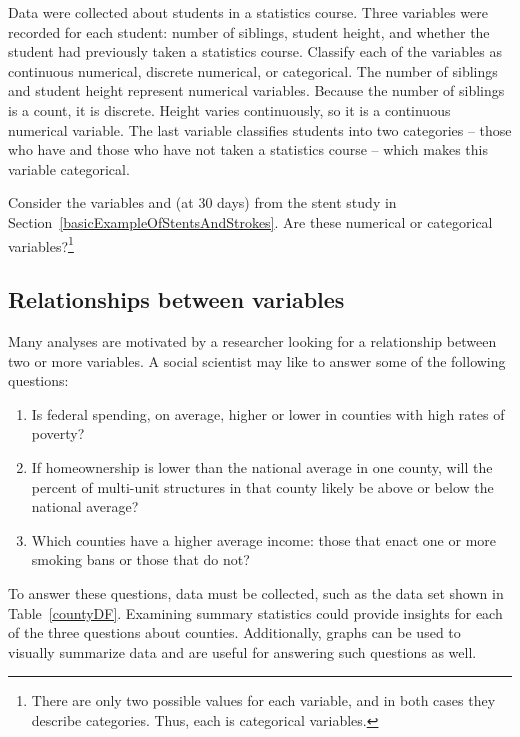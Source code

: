 \begin{example}{Data were collected about students in a statistics course. Three variables were recorded for each student: number of siblings, student height, and whether the student had previously taken a statistics course. Classify each of the variables as continuous numerical, discrete numerical, or categorical.}
The number of siblings and student height represent numerical variables. Because the number of siblings is a count, it is discrete. Height varies continuously, so it is a continuous numerical variable. The last variable classifies students into two categories -- those who have and those who have not taken a statistics course -- which makes this variable categorical.
\end{example}

\begin{exercise} 
Consider the variables  and  (at 30 days) from the stent study in Section~\ref{basicExampleOfStentsAndStrokes}. Are these numerical or categorical variables?\footnote{There are only two possible values for each variable, and in both cases they describe categories. Thus, each is categorical variables.}
\end{exercise}

\subsection{Relationships between variables}
\label{variableRelations}

Many analyses are motivated by a researcher looking for a relationship between two or more variables. A social scientist may like to answer some of the following questions:
\begin{enumerate}
\setlength{\itemsep}{0mm}
\item[(1)]\label{fedSpendingPovertyQuestion} Is federal spending, on average, higher or lower in counties with high rates of poverty?
\item[(2)]\label{ownershipMultiUnitQuestion} If homeownership is lower than the national average in one county, will the percent of multi-unit structures in that county likely be above or below the national average?
\item[(3)]\label{isAverageIncomeAssociatedWithSmokingBans} Which counties have a higher average income: those that enact one or more smoking bans or those that do not?
\end{enumerate}

To answer these questions, data must be collected, such as the  data set shown in Table~\ref{countyDF}. Examining summary statistics  could provide insights for each of the three questions about counties. Additionally, graphs can be used to visually summarize data and are useful for answering such questions as well.

